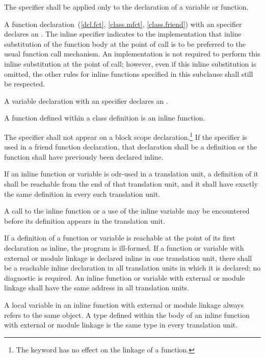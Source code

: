\pnum
The  specifier shall be applied only to the declaration
of a variable or function.

\pnum
{}%
%
A function declaration~(\ref{dcl.fct}, \ref{class.mfct},
\ref{class.friend}) with an  specifier declares an
. The inline specifier indicates to
the implementation that inline substitution of the function body at the
point of call is to be preferred to the usual function call mechanism.
An implementation is not required to perform this inline substitution at
the point of call; however, even if this inline substitution is omitted,
the other rules for inline functions specified in this subclause shall
still be respected.

\pnum
A variable declaration with an  specifier declares an
.

\pnum
A function defined within a class definition is an inline function.

\pnum
The  specifier shall not appear on a block scope
declaration.\footnote{The  keyword has no effect on the linkage of a function.}
If the  specifier is used in a friend function declaration, that
declaration shall be a definition or the function shall have previously
been declared inline.

\pnum
If an inline function or variable
is odr-used in a translation unit,
a definition of it shall be reachable from the end of that translation unit,
and it shall have exactly the same definition
in every such translation unit.
\begin{note}
A call to the inline function or a use of the inline variable may be encountered before its definition
appears in the translation unit.
\end{note}
If a definition of a function or variable is reachable
at the point of its
first declaration as inline, the program is ill-formed. If a function or variable
with external or module linkage
is declared inline in one translation unit,
there shall be a reachable inline declaration
in all translation units in which it is declared;
no diagnostic is required.
An inline function or variable
with external or module linkage
shall have the same address in all translation units.
\begin{note}
A  local variable in an inline
function with external or module linkage
always refers to the same object.
A type defined within the body of an inline
function with external or module linkage is the
same type in every translation unit.
\end{note}


